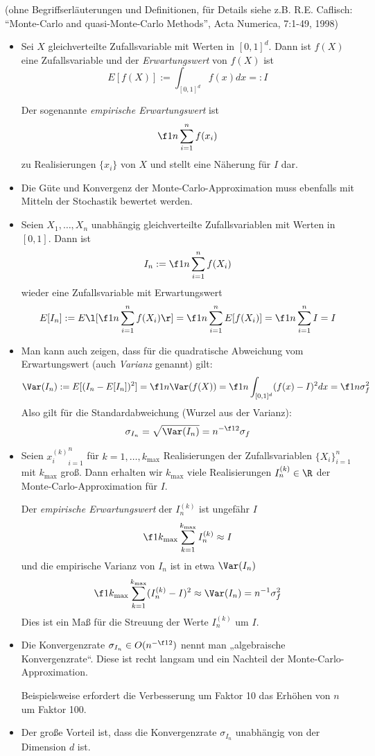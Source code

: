 \documentclass[11pt]{scrbook}
\begin{document}
(ohne Begriffserläuterungen und Definitionen, für Details siehe z.B. R.E. Caflisch: “Monte-Carlo and quasi-Monte-Carlo Methods”, Acta Numerica, 7:1-49, 1998)

\begin{itemize}
	\item
		Sei $X$ gleichverteilte Zufallsvariable mit Werten in $[0,1]^d$.
		Dann ist $f(X)$ eine Zufallsvariable und der \emph{Erwartungswert} von $f(X)$ ist
		\[
			E[f(X)] := \int_{[0,1]^d} f(x) dx =: I
		\]

		Der sogenannte \emph{empirische Erwartungswert} ist
		\[
			\f 1n \sum_{i=1}^n f(x_i)
		\]
		zu Realisierungen $\{x_i\}$ von $X$ und stellt eine Näherung für $I$ dar.
	\item
		Die Güte und Konvergenz der Monte-Carlo-Approximation muss ebenfalls mit Mitteln der Stochastik bewertet werden.
	\item
		Seien $X_1, \dotsc, X_n$ unabhängig gleichverteilte Zufallsvariablen mit Werten in $[0,1]$.
		Dann ist
		\[
			I_n := \f 1n \sum_{i=1}^n f(X_i)
		\]
		wieder eine Zufallsvariable mit Erwartungswert
		\[
			E[I_n] := E\l[\f 1n \sum_{i=1}^n f(X_i)\r] = \f 1n \sum_{i=1}^n E[f(X_i)] = \f 1n \sum_{i=1}^n I = I
		\]
	\item
		Man kann auch zeigen, dass für die quadratische Abweichung vom Erwartungswert (auch \emph{Varianz} genannt) gilt:
		\[
			\Var(I_n) := E[(I_n-E[I_n])^2] = \f 1n \Var(f(X)) = \f 1n \int_{[0,1]^d} (f(x) - I)^2 dx = \f 1n \sigma_f^2
		\]
		Also gilt für die Standardabweichung (Wurzel aus der Varianz):
		\[
			\sigma_{I_n} = \sqrt{\Var(I_n)} = n^{-\f 12} \sigma_f
		\]
	\item
		Seien ${x_i^{(k)}}_{i=1}^n$ für $k=1,\dotsc, k_{\text{max}}$ Realisierungen der Zufallsvariablen $\{X_i\}_{i=1}^n$ mit $k_{\text{max}}$ groß.
		Dann erhalten wir $k_{\text{max}}$ viele Realisierungen $I_n^{(k)}\in \R$ der Monte-Carlo-Approximation für $I$.

		Der \emph{empirische Erwartungswert} der $I_n^{(k)}$ ist ungefähr $I$
		\[
			\f 1{k_{\text{max}}} \sum_{k=1}^{k_{\text{max}}} I_n^{(k)} \approx I
		\]
		und die empirische Varianz von $I_n$ ist in etwa $\Var(I_n)$
		\[
			\f 1{k_{\text{max}}} \sum_{k=1}^{k_{\text{max}}}(I_n^{(k)} - I)^2 \approx \Var(I_n) = n^{-1} \sigma_f^2
		\]
		Dies ist ein Maß für die Streuung der Werte $I_n^{(k)}$ um $I$.
	\item
		Die Konvergenzrate $\sigma_{I_n} \in O(n^{-\f 12})$ nennt man „algebraische Konvergenzrate“.
		Diese ist recht langsam und ein Nachteil der Monte-Carlo-Approximation.
		
		Beispielsweise erfordert die Verbesserung um Faktor 10 das Erhöhen von $n$ um Faktor 100.
	\item
		Der große Vorteil ist, dass die Konvergenzrate $\sigma_{I_n}$ unabhängig von der Dimension $d$ ist.
\end{itemize}
\end{document}
